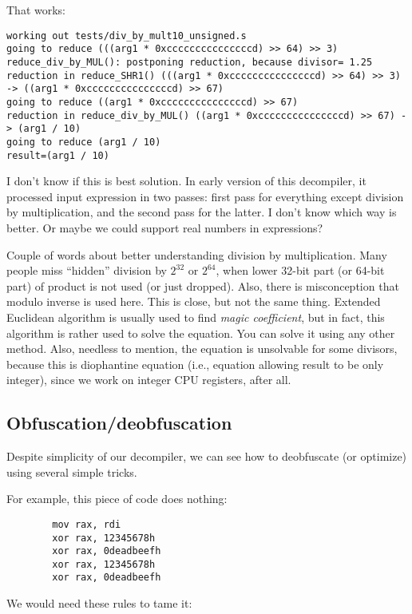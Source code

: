 That works:

\begin{lstlisting}
working out tests/div_by_mult10_unsigned.s
going to reduce (((arg1 * 0xcccccccccccccccd) >> 64) >> 3)
reduce_div_by_MUL(): postponing reduction, because divisor= 1.25
reduction in reduce_SHR1() (((arg1 * 0xcccccccccccccccd) >> 64) >> 3) -> ((arg1 * 0xcccccccccccccccd) >> 67)
going to reduce ((arg1 * 0xcccccccccccccccd) >> 67)
reduction in reduce_div_by_MUL() ((arg1 * 0xcccccccccccccccd) >> 67) -> (arg1 / 10)
going to reduce (arg1 / 10)
result=(arg1 / 10)
\end{lstlisting}

I don't know if this is best solution. In early version of this decompiler, it processed input expression in two passes:
first pass for everything except division by multiplication, and the second pass for the latter.
I don't know which way is better.
Or maybe we could support real numbers in expressions?

Couple of words about better understanding division by multiplication.
Many people miss ``hidden'' division by $2^{32}$ or $2^{64}$,
when lower 32-bit part (or 64-bit part) of product is not used (or just dropped).
Also, there is misconception that modulo inverse is used here. This is close, but not the same thing.
Extended Euclidean algorithm is usually used to find \textit{magic coefficient}, but in fact,
this algorithm is rather used to solve the equation. You can solve it using any other method.
Also, needless to mention, the equation is unsolvable for some divisors, because this is diophantine equation
(i.e., equation allowing result to be only integer), since we work on integer CPU registers, after all.

\subsection{Obfuscation/deobfuscation}

Despite simplicity of our decompiler, we can see how to deobfuscate (or optimize) using several simple tricks.

For example, this piece of code does nothing:

\begin{lstlisting}
        mov rax, rdi
        xor rax, 12345678h
        xor rax, 0deadbeefh
        xor rax, 12345678h
        xor rax, 0deadbeefh
\end{lstlisting}

We would need these rules to tame it:

